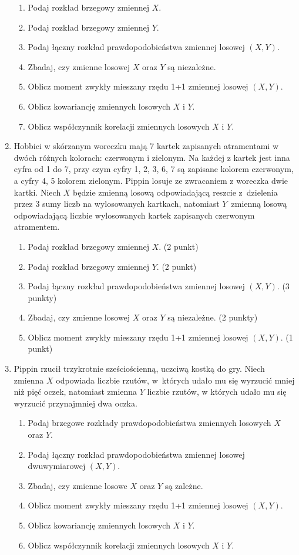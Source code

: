 \documentclass{mwart}
\begin{document}
\begin{enumerate}
\begin{enumerate}
\item Podaj rozkład brzegowy zmiennej $X$.
\item Podaj rozkład brzegowy zmiennej $Y$.
\item Podaj łączny rozkład prawdopodobieństwa zmiennej losowej $(X,Y)$.
\item Zbadaj, czy zmienne losowej $X$ oraz $Y$ są niezależne.
\item Oblicz moment zwykły mieszany rzędu 1+1 zmiennej losowej $(X,Y)$.
\item Oblicz kowariancję zmiennych losowych $X$ i $Y$.
\item Oblicz współczynnik korelacji zmiennych losowych $X$ i $Y$.
\end{enumerate}

\item Hobbici w skórzanym woreczku mają 7 kartek zapisanych atramentami w dwóch różnych kolorach: czerwonym i zielonym.
Na każdej z kartek jest inna cyfra od 1 do 7, przy czym cyfry 1, 2, 3, 6, 7 są zapisane kolorem czerwonym, a cyfry 4, 5 kolorem zielonym.
Pippin losuje ze zwracaniem z woreczka dwie kartki.
Niech $X$ będzie zmienną losową odpowiadającą reszcie z~dzielenia przez 3 sumy liczb na wylosowanych kartkach, natomiast $Y$~zmienną losową odpowiadającą liczbie wylosowanych kartek zapisanych czerwonym atramentem.

\begin{enumerate}
\item Podaj rozkład brzegowy zmiennej $X$. (2 punkt)
\item Podaj rozkład brzegowy zmiennej $Y$. (2 punkt)
\item Podaj łączny rozkład prawdopodobieństwa zmiennej losowej $(X,Y)$. (3 punkty)
\item Zbadaj, czy zmienne losowej $X$ oraz $Y$ są niezależne. (2 punkty)
\item Oblicz moment zwykły mieszany rzędu 1+1 zmiennej losowej $(X,Y)$. (1 punkt)
\end{enumerate}

\item Pippin rzucił trzykrotnie sześciościenną, uczciwą kostką do gry. Niech zmienna $X$ odpowiada liczbie rzutów, w~których udało mu się wyrzucić mniej niż pięć
oczek, natomiast zmienna $Y$ liczbie rzutów, w których udało mu się wyrzucić przynajmniej dwa oczka.
\begin{enumerate}
\item Podaj brzegowe rozkłady prawdopodobieństwa zmiennych losowych $X$ oraz $Y$.
\item Podaj łączny rozkład prawdopodobieństwa zmiennej losowej dwuwymiarowej $(X,Y)$.
\item Zbadaj, czy zmienne losowe $X$ oraz $Y$ są zależne.
\item Oblicz moment zwykły mieszany rzędu 1+1 zmiennej losowej $(X,Y)$.
\item Oblicz kowariancję zmiennych losowych $X$ i $Y$.
\item Oblicz współczynnik korelacji zmiennych losowych $X$ i $Y$.
\end{enumerate}


\end{enumerate}
\end{document}
